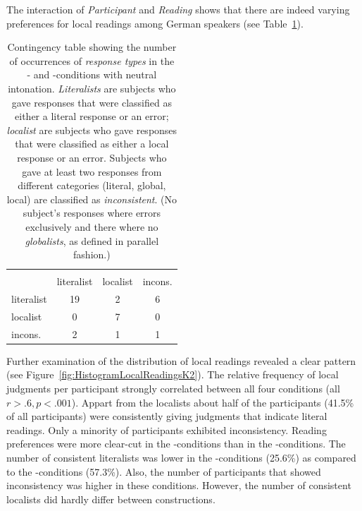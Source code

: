 \documentclass[fleqn,reqno,10pt,draft]{article}
\newcommand{\as}{\acro{as}}
\renewcommand{\es}{\acro{es}}
\begin{document}
The interaction of {\it Participant} and {\it Reading} shows that
there are indeed varying preferences for local readings among German
speakers (see Table~\ref{table:answer-types-as}).
%
\begin{table}[t]
  \centering
      \begin{tabular}{lccc}
      & \multicolumn{3}{c}{\es} \\ \cmidrule(r){2-4}
      \as & literalist & localist & incons. \\ \midrule
      literalist   & 19 & 2 & 6\\
      localist     &  0 & 7 & 0 \\
      incons. &  2 & 1 & 1\\
    \end{tabular}
    \caption{Contingency table showing the number of occurrences of
      \emph{response types} in the \as- and \es-conditions with
      neutral intonation. \emph{Literalists} are subjects who gave
      responses that were classified as either a literal response or
      an error; \emph{localist} are subjects who gave responses
      that were classified as either a 
      local response or an error. Subjects who gave at least two
      responses from different categories (literal, global, local) are
      classified as \emph{inconsistent}. (No subject's responses where
      errors exclusively and there where no \emph{globalists}, as
      defined in parallel fashion.)}
    \label{table:answer-types-as}
\end{table}
%
Further examination of the distribution of local readings revealed a
clear pattern (see Figure~\ref{fig:HistogramLocalReadingsK2}). The
relative frequency of local judgments per participant strongly
correlated between all four conditions (all $r>.6, p<.001$). Appart
from the localists about half of the participants (41.5\% of all
participants) were consistently giving
judgments that indicate literal readings. Only a minority of
participants exhibited inconsistency. Reading preferences were more
clear-cut in the \as-conditions than in the \es-conditions. The number
of consistent literalists was lower in the \es-conditions (25.6\%) as
compared to the \as-conditions (57.3\%). Also, the number of
participants that showed inconsistency was higher in these
conditions. However, the number of consistent localists did hardly
differ between constructions.
\end{document}
